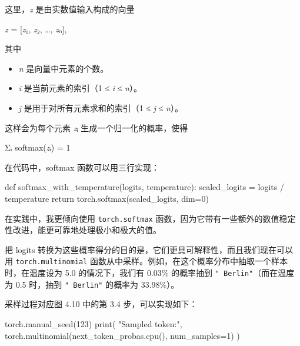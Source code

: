 \begin{mySidebarBox}

这里，\emph{z} 是由实数值输入构成的向量

\end{mySidebarBox}

\emph{z} = [\emph{z}₁, \emph{z}₂, …, \emph{z}ₙ],

\begin{mySidebarBox}

其中

\begin{itemize}
\item \emph{n }是向量中元素的个数。
\item \emph{i }是当前元素的索引（1 ≤ \emph{i} ≤ \emph{n}）。
\item \emph{j }是用于对所有元素求和的索引（1 ≤ \emph{j} ≤ \emph{n}）。
\end{itemize}

这样会为每个元素 \emph{z}ᵢ 生成一个归一化的概率，使得

\end{mySidebarBox}

Σᵢ softmax(\emph{z}ᵢ) = 1

\begin{mySidebarBox}

在代码中，softmax 函数可以用三行实现：

\begin{codebox}
def softmax_with_temperature(logits, temperature):
    scaled_logits = logits / temperature
    return torch.softmax(scaled_logits, dim=0)
\end{codebox}

在实践中，我更倾向使用 \texttt{torch.softmax} 函数，因为它带有一些额外的数值稳定性改进，能更可靠地处理极小和极大的值。

\end{mySidebarBox}

把 logits 转换为这些概率得分的目的是，它们更具可解释性，而且我们现在可以用 \texttt{torch.multinomial} 函数从中采样。例如，在这个概率分布中抽取一个样本时，在温度设为 5.0 的情况下，我们有 0.03\% 的概率抽到 \texttt{"}\texttt{ Berlin}\texttt{"}（而在温度为 0.5 时，抽到 \texttt{"}\texttt{ Berlin}\texttt{"} 的概率为 33.98\%）。

采样过程对应图 4.10 中的第 3.4 步，可以实现如下：

\begin{codebox}
torch.manual_seed(123)
print(
    "Sampled token:",
    torch.multinomial(next_token_probas.cpu(), num_samples=1)
)
\end{codebox}

